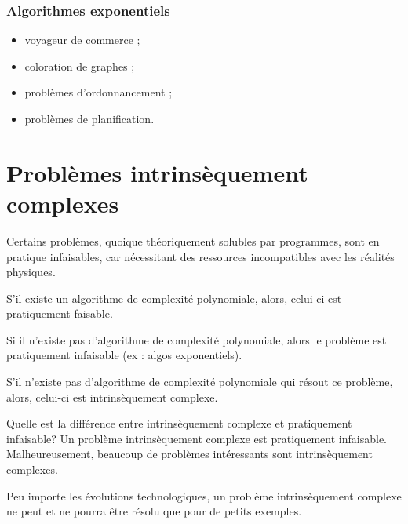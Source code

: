 \subsubsection{Algorithmes exponentiels}
\begin{itemize}
\item voyageur de commerce ;
\item coloration de graphes ;
\item problèmes d'ordonnancement ;
\item problèmes de planification.
\end{itemize}

\section{Problèmes intrinsèquement complexes}
Certains problèmes, quoique théoriquement solubles par programmes, sont en pratique infaisables, car nécessitant des ressources incompatibles avec les réalités physiques.

\begin{mydef}
	S’il existe un algorithme de complexité polynomiale, alors, celui-ci est pratiquement faisable.
\end{mydef}

\begin{mydef}
	 Si il n'existe pas d'algorithme de complexité polynomiale, alors le problème est pratiquement infaisable (ex : algos exponentiels).

\end{mydef}

\begin{mydef}
	S’il n'existe pas d'algorithme de complexité polynomiale qui résout ce
	problème, alors, celui-ci est intrinsèquement complexe.
\end{mydef}

\begin{myrem}
	Quelle est la différence entre intrinsèquement complexe et pratiquement
	infaisable? Un problème intrinsèquement complexe est pratiquement infaisable. Malheureusement, beaucoup de problèmes intéressants sont intrinsèquement complexes.
\begin{myrem}
	Peu importe les évolutions technologiques, un problème intrinsèquement complexe ne peut et ne pourra être résolu que pour de petits exemples.
\end{myrem}
	
\end{myrem}
